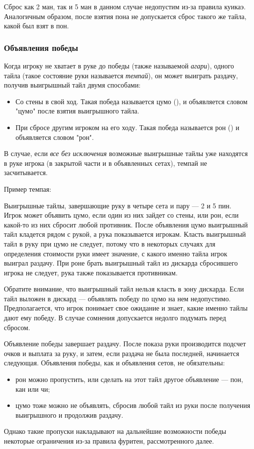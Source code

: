  \hfill {}

Сброс как 2 ман, так и 5 ман в данном случае недопустим из-за правила куикаэ. Аналогичным образом, после взятия пона не допускается сброс такого же тайла, какой был взят в пон.

\subsubsection{Объявления победы}

Когда игроку не хватает в руке до победы (также называемой \textit{агари}), одного тайла (такое состояние руки называется \textit{темпай}), он может выиграть раздачу, получив выигрышный тайл двумя способами:

\begin{itemize}
	\item Со стены в свой ход. Такая победа называется цумо (), и объявляется словом "цумо" после взятия выигрышного тайла.
	\item При сбросе другим игроком на его ходу. Такая победа называется рон () и объявляется словом "рон".
\end{itemize}

В случае, если \textit{все без исключения} возможные выигрышные тайлы уже находятся в руке игрока (в закрытой части и в объявленных сетах), темпай не засчитывается.

Пример темпая:

 \hfill {}

Выигрышные тайлы, завершающие руку в четыре сета и пару --- 2 и 5 пин. Игрок может объявить цумо, если один из них зайдет со стены, или рон, если какой-то из них сбросит любой противник. После объявления цумо выигрышный тайл кладется рядом с рукой, а рука показывается игрокам. Класть выигрышный тайл в руку при цумо не следует, потому что в некоторых случаях для определения стоимости руки имеет значение, с какого именно тайла игрок выиграл раздачу. При роне брать выигрышный тайл из дискарда сбросившего игрока не следует, рука также показывается противникам.

Обратите внимание, что выигрышный тайл нельзя класть в зону дискарда. Если тайл выложен в дискард --- объявлять победу по цумо на нем недопустимо. Предполагается, что игрок понимает свое ожидание и знает, какие именно тайлы дают ему победу. В случае сомнения допускается недолго подумать перед сбросом.

Объявление победы завершает раздачу. После показа руки производится подсчет очков и выплата за руку, и затем, если раздача не была последней, начинается следующая. Объявления победы, как и объявления сетов, не обязательны:
\begin{itemize}
	\item рон можно пропустить, или сделать на этот тайл другое объявление --- пон, кан или чи;
	\item цумо тоже можно не объявлять, сбросив любой тайл из руки после получения выигрышного и продолжив раздачу.
\end{itemize}
Однако такие пропуски накладывают на дальнейшие возможности победы некоторые ограничения из-за правила фуритен, рассмотренного далее.

